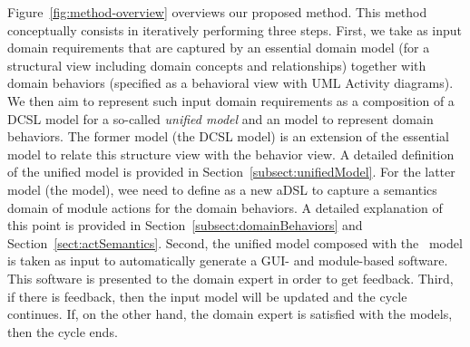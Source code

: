 Figure~\ref{fig:method-overview} overviews our proposed method. This method conceptually consists in iteratively performing three steps. First, we take as input domain requirements that are captured by an essential domain model (for a structural view including domain concepts and relationships) together with domain behaviors (specified as a behavioral view with UML Activity diagrams). We then aim to represent such input domain requirements as a composition of a DCSL model for a so-called \textit{unified model} and an \agl model to represent domain behaviors. The former model (the DCSL model) is an extension of the essential model to relate this structure view with the behavior view. A detailed definition of the unified model is provided in Section~\ref{subsect:unifiedModel}. For the latter model (the \agl model), wee need to define \agl as a new aDSL to capture a semantics domain of module actions for the domain behaviors. %
A detailed explanation of this point is provided in Section~\ref{subsect:domainBehaviors} and Section~\ref{sect:actSemantics}. %
%
%
%
Second, the unified model composed with the \agl~model is taken as input to automatically generate a GUI- and module-based software. This software is presented to the domain expert in order to get feedback. %
%
Third, if there is feedback, then the input model will be updated and the cycle continues. If, on the other hand, the domain expert is satisfied with the models, then the cycle ends.

